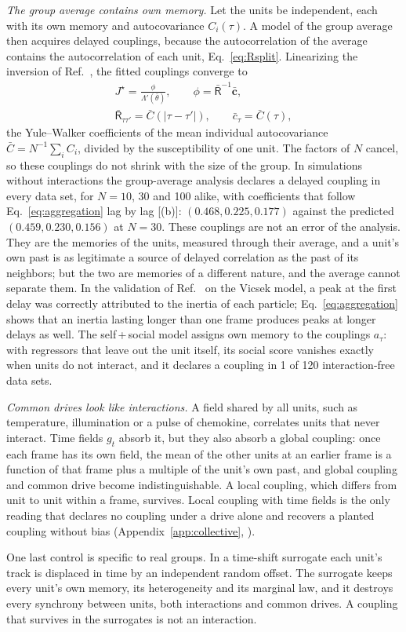 \emph{The group average contains own memory.} Let the units be independent, each with its own memory and autocovariance $C_i(\tau)$. A model of the group average then acquires delayed couplings, because the autocorrelation of the average contains the autocorrelation of each unit, Eq.~\eqref{eq:Rsplit}. Linearizing the inversion of Ref.~\cite{Agliari2024}, the fitted couplings converge to
\begin{equation}
\begin{gathered}
J^\star=\frac{\phi}{\Lambda'(\bar\theta)},\qquad\phi=\bar{\mathsf R}^{-1}\bar{\bm c},\\
\bar{\mathsf R}_{\tau\tau'}=\bar C(|\tau-\tau'|),\qquad \bar c_\tau=\bar C(\tau),
\end{gathered}
\label{eq:aggregation}
\end{equation}
the Yule--Walker coefficients of the mean individual autocovariance $\bar C=N^{-1}\sum_iC_i$, divided by the susceptibility of one unit. The factors of $N$ cancel, so these couplings do not shrink with the size of the group. In simulations without interactions the group-average analysis declares a delayed coupling in every data set, for $N=10$, 30 and 100 alike, with coefficients that follow Eq.~\eqref{eq:aggregation} lag by lag [(b)]: $(0.468,0.225,0.177)$ against the predicted $(0.459,0.230,0.156)$ at $N=30$. These couplings are not an error of the analysis. They are the memories of the units, measured through their average, and a unit's own past is as legitimate a source of delayed correlation as the past of its neighbors; but the two are memories of a different nature, and the average cannot separate them. In the validation of Ref.~\cite{Agliari2024} on the Vicsek model, a peak at the first delay was correctly attributed to the inertia of each particle; Eq.~\eqref{eq:aggregation} shows that an inertia lasting longer than one frame produces peaks at longer delays as well. The self\,+\,social model assigns own memory to the couplings $a_\tau$: with regressors that leave out the unit itself, its social score vanishes exactly when units do not interact, and it declares a coupling in 1 of 120 interaction-free data sets.

\emph{Common drives look like interactions.} A field shared by all units, such as temperature, illumination or a pulse of chemokine, correlates units that never interact. Time fields $g_t$ absorb it, but they also absorb a global coupling: once each frame has its own field, the mean of the other units at an earlier frame is a function of that frame plus a multiple of the unit's own past, and global coupling and common drive become indistinguishable. A local coupling, which differs from unit to unit within a frame, survives. Local coupling with time fields is the only reading that declares no coupling under a drive alone and recovers a planted coupling without bias (Appendix~\ref{app:collective}, ).

One last control is specific to real groups. In a time-shift surrogate each unit's track is displaced in time by an independent random offset. The surrogate keeps every unit's own memory, its heterogeneity and its marginal law, and it destroys every synchrony between units, both interactions and common drives. A coupling that survives in the surrogates is not an interaction.
